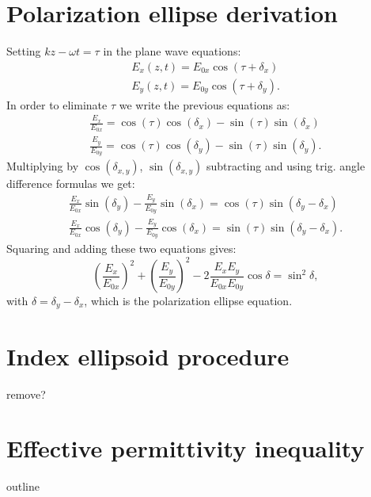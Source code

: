 \section{Polarization ellipse derivation}
\label{sec:deriv_pol_ellipse}
Setting $kz-\omega t=\tau$ in the plane wave equations:
\begin{equation}
\begin{aligned}
    E_x(z, t) = E_{0x}\cos(\tau + \delta_x) \\
    E_y(z, t) = E_{0y}\cos(\tau + \delta_y).
\end{aligned}
\end{equation}
In order to eliminate $\tau$ we write the previous equations as:
\begin{equation}
\begin{aligned}
    \frac{E_x}{E_{0x}} = \cos(\tau)\cos(\delta_x) - \sin(\tau)\sin(\delta_x)\\
    \frac{E_y}{E_{0y}} = \cos(\tau)\cos(\delta_y) - \sin(\tau)\sin(\delta_y).
\end{aligned}
\end{equation}
Multiplying by $\cos(\delta_{x,y})$, $\sin(\delta_{x,y})$ subtracting and using trig. angle difference formulas we get:
\begin{equation}
\begin{aligned}
    \frac{E_x}{E_{0x}}\sin(\delta_y) - \frac{E_y}{E_{0y}}\sin(\delta_x) = \cos(\tau)\sin(\delta_y-\delta_x)\\
    \frac{E_x}{E_{0x}}\cos(\delta_y) - \frac{E_y}{E_{0y}}\cos(\delta_x) = \sin(\tau)\sin(\delta_y-\delta_x).
\end{aligned}
\end{equation}
Squaring and adding these two equations gives:
\begin{equation}
    \left(\frac{E_x}{E_{0x}}\right)^2+\left(\frac{E_y}{E_{0y}}\right)^2-2\frac{E_x E_y}{E_{0x} E_{0y}}\cos \delta =\sin^2 \delta,
\end{equation}
with $\delta=\delta_y-\delta_x$, which is the polarization ellipse equation.

\section{Index ellipsoid procedure}
\label{sec:index_ellipse_proof}
remove?

\section{Effective permittivity inequality}
\label{sec:bf_proof}
outline


